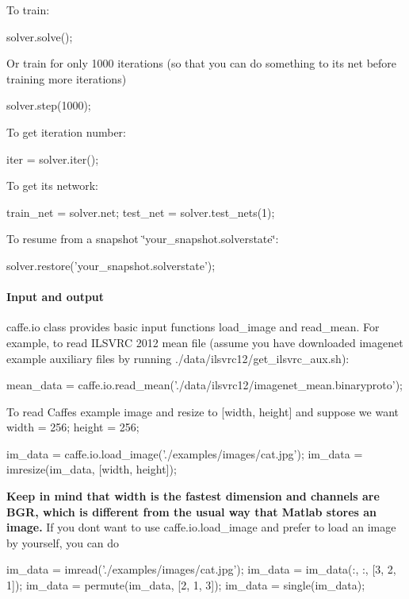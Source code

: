 To train\+: \begin{DoxyVerb}solver.solve();
\end{DoxyVerb}


Or train for only 1000 iterations (so that you can do something to its net before training more iterations) \begin{DoxyVerb}solver.step(1000);
\end{DoxyVerb}


To get iteration number\+: \begin{DoxyVerb}iter = solver.iter();
\end{DoxyVerb}


To get its network\+: \begin{DoxyVerb}train_net = solver.net;
test_net = solver.test_nets(1);
\end{DoxyVerb}


To resume from a snapshot \char`\"{}your\+\_\+snapshot.\+solverstate\char`\"{}\+: \begin{DoxyVerb}solver.restore('your_snapshot.solverstate');
\end{DoxyVerb}


\paragraph*{Input and output}

{\ttfamily caffe.\+io} class provides basic input functions {\ttfamily load\+\_\+image} and {\ttfamily read\+\_\+mean}. For example, to read I\+L\+S\+V\+RC 2012 mean file (assume you have downloaded imagenet example auxiliary files by running {\ttfamily ./data/ilsvrc12/get\+\_\+ilsvrc\+\_\+aux.sh})\+: \begin{DoxyVerb}mean_data = caffe.io.read_mean('./data/ilsvrc12/imagenet_mean.binaryproto');
\end{DoxyVerb}


To read Caffe\textquotesingle{}s example image and resize to {\ttfamily \mbox{[}width, height\mbox{]}} and suppose we want {\ttfamily width = 256; height = 256;} \begin{DoxyVerb}im_data = caffe.io.load_image('./examples/images/cat.jpg');
im_data = imresize(im_data, [width, height]); %
\end{DoxyVerb}


{\bfseries Keep in mind that {\ttfamily width} is the fastest dimension and channels are B\+GR, which is different from the usual way that Matlab stores an image.} If you don\textquotesingle{}t want to use {\ttfamily caffe.\+io.\+load\+\_\+image} and prefer to load an image by yourself, you can do \begin{DoxyVerb}im_data = imread('./examples/images/cat.jpg'); %
im_data = im_data(:, :, [3, 2, 1]); %
im_data = permute(im_data, [2, 1, 3]); %
im_data = single(im_data); %
\end{DoxyVerb}


